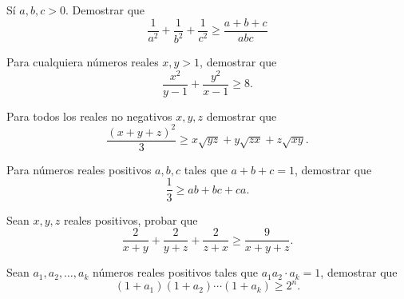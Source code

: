 \documentclass[12pt]{article}
\begin{document}
    \begin{prob-without-section}
        Sí $a,b,c > 0$. Demostrar que
        \[
            \frac{1}{a^2} + \frac{1}{b^2} + \frac{1}{c^2} \geq \frac{a + b + c}{abc}
        \]
    \end{prob-without-section}

    \begin{prob-without-section}
        Para cualquiera números reales $x, y > 1$, demostrar que
        \[
            \frac{x^2}{y - 1} + \frac{y^2}{x - 1} \geq 8.
        \]
    \end{prob-without-section}

    \begin{prob-without-section}
        Para todos los reales no negativos $x,y,z$ demostrar que
        \[
            \frac{(x + y + z)^2}{3} \geq x \sqrt {yz} + y \sqrt {zx} + z \sqrt {xy}.
        \]
    \end{prob-without-section}

    \begin{prob-without-section}
        Para números reales positivos $a,b,c$ tales que $a + b + c = 1$, demostrar que
        \[
            \frac{1}{3} \geq ab + bc + ca.
        \]
    \end{prob-without-section}

    \begin{prob-without-section}
        Sean $x,y,z$ reales positivos, probar que
        \[
            \frac{2}{x + y} + \frac{2}{y + z} + \frac{2}{z + x} \geq \frac{9}{x + y + z}.
        \]
    \end{prob-without-section}

    \begin{prob-without-section}
        Sean $a_1, a_2, \ldots, a_k$ números reales positivos tales que $a_1 a_2 \cdot a_k = 1$, demostrar que
        \[
            (1 + a_1)(1 + a_2) \cdots (1 + a_k) \geq 2^n.
        \]
    \end{prob-without-section}
\end{document}
